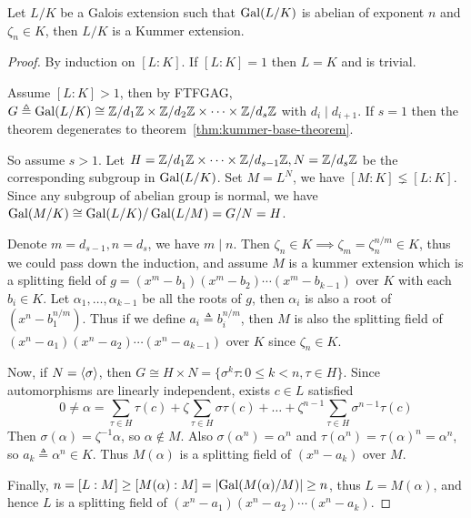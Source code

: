 \begin{theorem}
  Let $L/K$ be a Galois extension such that $\operatorname{Gal}(L/K)$ is abelian of exponent $n$
  and $\zeta_n \in K$, then $L/K$ is a Kummer extension.

  \begin{proof}
    By induction on $[L: K]$. If $[L: K] = 1$ then $L = K$ and is trivial.

    Assume $[L: K] > 1$, then by FTFGAG, $G \triangleq \operatorname{Gal}(L/K) \cong {\mathbb{Z}}/{d_1 \mathbb{Z}}
    \times {\mathbb{Z}}/{d_2 \mathbb{Z}} \times \dots \times {\mathbb{Z}}/{d_s \mathbb{Z}}$ with $d_i \mid d_{i+1}$.
    If $s = 1$ then the theorem degenerates to theorem~\ref{thm:kummer-base-theorem}.

    So assume $s > 1$. Let $H = \mathbb{Z} / d_1 \mathbb{Z} \times \dots \times \mathbb{Z} / d_{s-1} \mathbb{Z},
    N = \mathbb{Z} / d_s \mathbb{Z}$ be the corresponding subgroup in $\operatorname{Gal}(L/K)$.
    Set $M = L^N$, we have $[M: K] \lneq [L: K]$. Since any subgroup
    of abelian group is normal, we have $\operatorname{Gal}(M/K) \cong \operatorname{Gal}(L/K) / \operatorname{Gal}(L/M) = G / N = H$.

    Denote $m = d_{s-1}, n = d_{s}$, we have $m \mid n$.
    Then $\zeta_n \in K \implies \zeta_m = \zeta_n^{n/m} \in K$,
    thus we could pass down the induction, and assume $M$ is a kummer extension which is a splitting
    field of $g = (x^m - b_1) (x^m - b_2) \dotsm (x^m - b_{k-1})$ over $K$ with each $b_i \in K$.
    Let $\alpha_1, \dots, \alpha_{k-1}$ be all the roots of $g$, then $\alpha_i$
    is also a root of $(x^n - b_1^{n/m})$. Thus if we define $a_i \triangleq b_i^{n/m}$, then
    $M$ is also the splitting field of $(x^n - a_1) (x^n - a_2) \dotsm (x^n - a_{k-1})$ over $K$
    since $\zeta_n \in K$.

    Now, if $N = \langle\sigma\rangle$, then $G \cong H \times N = \{\sigma^k \tau : 0 \leq k < n, \tau \in H\}$.
    Since automorphisms are linearly independent, exists $c \in L$ satisfied
    \[ 0 \neq \alpha = \sum_{\tau \in H} \tau(c) + \zeta \sum_{\tau \in H} \sigma \tau(c)
    + \dots + \zeta^{n-1} \sum_{\tau \in H} \sigma^{n-1} \tau(c) \]
    Then $\sigma(\alpha) = \zeta^{-1} \alpha$, so $\alpha \not\in M$. Also $\sigma(\alpha^n) = \alpha^n$
    and $\tau(\alpha^n) = \tau(\alpha)^n = \alpha^n$, so $a_k \triangleq \alpha^n \in K$.
    Thus $M(\alpha)$ is a splitting field of $(x^n - a_k)$ over $M$.

    Finally, $n = [L: M] \geq [M(\alpha): M] = \lvert\operatorname{Gal}(M(\alpha) / M)\rvert \geq n$,
    thus $L = M(\alpha)$, and hence $L$ is a splitting field of
    $(x^n - a_1) (x^n - a_2) \dotsm (x^n - a_k)$.
  \end{proof}
\end{theorem}

